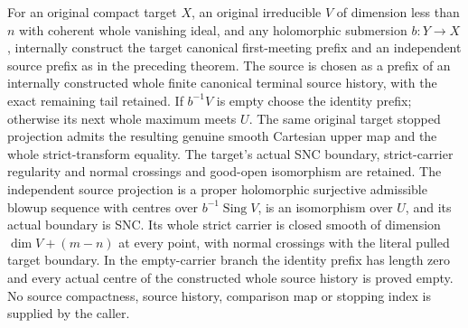 \begin{theorem}
\label{hir:original-independent-stopped-smooth-source-producer}
\leanok
For an original compact target $X$, an original irreducible $V$ of
dimension less than $n$ with coherent whole vanishing ideal, and any
holomorphic submersion $b:Y\to X$, internally construct the target
canonical first-meeting prefix and an independent source prefix as in
the preceding theorem.  The source is chosen as a prefix of an
internally constructed whole finite canonical terminal source history,
with the exact remaining tail retained.  If $b^{-1}V$ is empty choose the
identity prefix; otherwise its next whole maximum meets $U$.
The same original target stopped projection admits the resulting genuine
smooth Cartesian upper map and the whole strict-transform equality.
The target's actual SNC boundary, strict-carrier regularity and normal
crossings and good-open isomorphism are retained.  The independent source
projection is a proper holomorphic surjective admissible blowup sequence
with centres over $b^{-1}\operatorname{Sing}V$, is an isomorphism over $U$,
and its actual boundary is SNC.  Its whole strict carrier is closed
smooth of dimension $\dim V+(m-n)$ at every point, with normal crossings
with the literal pulled target boundary.  In the empty-carrier branch
the identity prefix has length zero and every actual centre of the
constructed whole source history is proved empty.
No source compactness, source history, comparison map or stopping index
is supplied by the caller.
\end{theorem}
